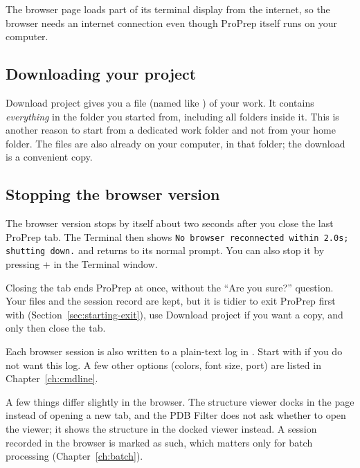 The browser page loads part of its terminal display from the internet, so the
browser needs an internet connection even though ProPrep itself runs on your
computer.

\subsection*{Downloading your project}

\textsf{Download project} gives you a  file (named like
) of your work. It contains
\emph{everything} in the folder you started  from,
including all folders inside it. This is another reason to start
 from a dedicated work folder and not from your home folder.
The files are also already on your computer, in that folder; the download is a
convenient copy.

\subsection*{Stopping the browser version}

The browser version stops by itself about two seconds after you close the last
ProPrep tab. The Terminal then shows
\texttt{No browser reconnected within 2.0s; shutting down.} and returns to its
normal prompt. You can also stop it by pressing + in the
Terminal window.

\begin{watchout}
Closing the tab ends ProPrep at once, without the ``Are you sure?'' question.
Your files and the session record are kept, but it is tidier to exit ProPrep
first with  (Section~\ref{sec:starting-exit}), use
\textsf{Download project} if you want a copy, and only then close the tab.
\end{watchout}

\begin{behindscenes}
Each browser session is also written to a plain-text log in
. Start with 
if you do not want this log. A few other options (colors, font size, port) are
listed in Chapter~\ref{ch:cmdline}.
\end{behindscenes}

A few things differ slightly in the browser. The structure viewer docks in the
page instead of opening a new tab, and the PDB Filter does not ask whether to
open the viewer; it shows the structure in the docked viewer instead. A session
recorded in the browser is marked as such, which matters only for batch
processing (Chapter~\ref{ch:batch}).

